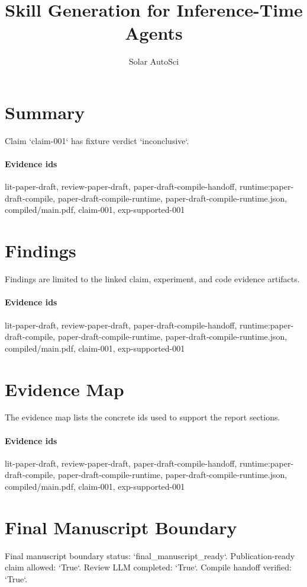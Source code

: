 \documentclass{article}
\title{Skill Generation for Inference-Time Agents}
\author{Solar AutoSci}
\date{}
\begin{document}
\maketitle

\section{Summary}
Claim `claim-001` has fixture verdict `inconclusive`.

\paragraph{Evidence ids} lit-paper-draft, review-paper-draft, paper-draft-compile-handoff, runtime:paper-draft-compile, paper-draft-compile-runtime, paper-draft-compile-runtime.json, compiled/main.pdf, claim-001, exp-supported-001

\section{Findings}
Findings are limited to the linked claim, experiment, and code evidence artifacts.

\paragraph{Evidence ids} lit-paper-draft, review-paper-draft, paper-draft-compile-handoff, runtime:paper-draft-compile, paper-draft-compile-runtime, paper-draft-compile-runtime.json, compiled/main.pdf, claim-001, exp-supported-001

\section{Evidence Map}
The evidence map lists the concrete ids used to support the report sections.

\paragraph{Evidence ids} lit-paper-draft, review-paper-draft, paper-draft-compile-handoff, runtime:paper-draft-compile, paper-draft-compile-runtime, paper-draft-compile-runtime.json, compiled/main.pdf, claim-001, exp-supported-001

\section{Final Manuscript Boundary}
Final manuscript boundary status: `final\_manuscript\_ready`. Publication-ready claim allowed: `True`. Review LLM completed: `True`. Compile handoff verified: `True`.
\end{document}
